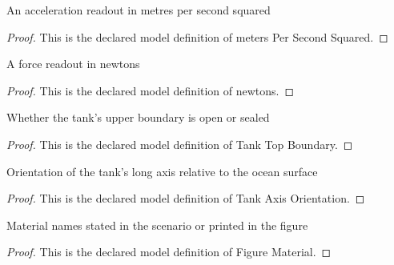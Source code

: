\begin{definition}
  \label{def:physics:phyx-mini-0386:phyxminiproblems-problemphyxmini0386-meterspersecondsquared}
  An acceleration readout in metres per second squared
\end{definition}
\begin{proof}
  This is the declared model definition of meters Per Second Squared.
\end{proof}
\begin{definition}[newtons]
  \label{def:physics:phyx-mini-0386:phyxminiproblems-problemphyxmini0386-newtons}
  A force readout in newtons
\end{definition}
\begin{proof}
  This is the declared model definition of newtons.
\end{proof}
\begin{definition}
  \label{def:physics:phyx-mini-0386:phyxminiproblems-problemphyxmini0386-tanktopboundary}
  Whether the tank's upper boundary is open or sealed
\end{definition}
\begin{proof}
  This is the declared model definition of Tank Top Boundary.
\end{proof}
\begin{definition}
  \label{def:physics:phyx-mini-0386:phyxminiproblems-problemphyxmini0386-tankaxisorientation}
  Orientation of the tank's long axis relative to the ocean surface
\end{definition}
\begin{proof}
  This is the declared model definition of Tank Axis Orientation.
\end{proof}
\begin{definition}
  \label{def:physics:phyx-mini-0386:phyxminiproblems-problemphyxmini0386-figurematerial}
  Material names stated in the scenario or printed in the figure
\end{definition}
\begin{proof}
  This is the declared model definition of Figure Material.
\end{proof}
